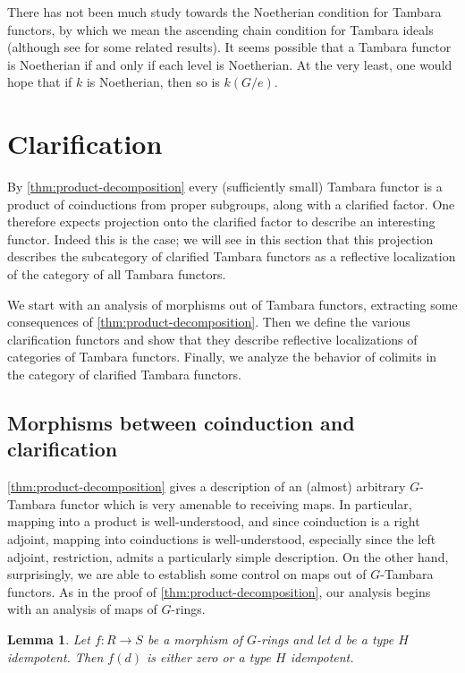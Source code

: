 \documentclass[11pt,dvipsnames]{amsart}
\newtheorem{lemma}[theorem]{Lemma}
\theoremstyle{BoldRemark}
\begin{document}
There has not been much study towards the Noetherian condition for Tambara functors, by which we mean the ascending chain condition for Tambara ideals (although see \cite{CW25} for some related results). It seems possible that a Tambara functor is Noetherian if and only if each level is Noetherian. At the very least, one would hope that if $k$ is Noetherian, then so is $k(G/e)$.
\section{Clarification}

By \cref{thm:product-decomposition} every (sufficiently small) Tambara functor is a product of coinductions from proper subgroups, along with a clarified factor. One therefore expects projection onto the clarified factor to describe an interesting functor. Indeed this is the case; we will see in this section that this projection describes the subcategory of clarified Tambara functors as a reflective localization of the category of all Tambara functors.

We start with an analysis of morphisms out of Tambara functors, extracting some consequences of \cref{thm:product-decomposition}. Then we define the various clarification functors and show that they describe reflective localizations of categories of Tambara functors. Finally, we analyze the behavior of colimits in the category of clarified Tambara functors.

\subsection{Morphisms between coinduction and clarification}

\cref{thm:product-decomposition} gives a description of an (almost) arbitrary $G$-Tambara functor which is very amenable to receiving maps. In particular, mapping into a product is well-understood, and since coinduction is a right adjoint, mapping into coinductions is well-understood, especially since the left adjoint, restriction, admits a particularly simple description. On the other hand, surprisingly, we are able to establish some control on maps out of $G$-Tambara functors. As in the proof of \cref{thm:product-decomposition}, our analysis begins with an analysis of maps of $G$-rings.

\begin{lemma}\label{lem:idempotent-orbits-analysis}
	Let $f : R \rightarrow S$ be a morphism of $G$-rings and let $d$ be a type $H$ idempotent. Then $f(d)$ is either zero or a type $H$ idempotent.
\end{lemma}
\end{document}
